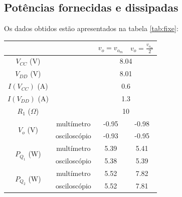 \documentclass[%
  reprint,
  nofootinbib,
  amsmath,amssymb,
  aps,
  10pt,
  a4paper
]{revtex4-1}
\begin{document}
{\subsection{Potências fornecidas e dissipadas}
Os dados obtidos estão apresentados na tabela \ref{tab:fixe}:
\begin{table}[h]
\begin{tabular}{|cc|c|c|}
                                                             & \multicolumn{1}{l|}{} & $v_o=v_{o_m}$ & $v_o=\frac{v_{o_m}}{2}$ \\ \hline
$V_{CC}$ (V)                                                 & \multicolumn{1}{l|}{} & \multicolumn{2}{c|}{8.04}               \\ \hline
$V_{DD}$ (V)                                                 & \multicolumn{1}{l|}{} & \multicolumn{2}{c|}{8.01}               \\ \hline
$I(V_{CC})$ (A)                                              & \multicolumn{1}{l|}{} & \multicolumn{2}{c|}{0.6}                \\ \hline
$I(V_{DD})$ (A)                                              & \multicolumn{1}{l|}{} & \multicolumn{2}{c|}{1.3}                \\ \hline
$R_1$ ($\Omega$)                                             &                       & \multicolumn{2}{c|}{10}                 \\ \hline
\multicolumn{1}{|c|}{\multirow{2}{*}{$V_o$ (V)}}             & multímetro            & -0.95         & -0.98                   \\ \cline{2-4} 
\multicolumn{1}{|c|}{}                                       & osciloscópio          & -0.93         & -0.95                   \\ \hline
\multicolumn{1}{|c|}{\multirow{2}{*}{$P_{Q_1}$ (W)}}         & multímetro            & 5.39          & 5.41                    \\ \cline{2-4} 
\multicolumn{1}{|c|}{}                                       & osciloscópio          & 5.38          & 5.39                    \\ \hline
\multicolumn{1}{|c|}{\multirow{2}{*}{$P_{Q_2}$ (W)}}         & multímetro            & 5.52          & 7.82                    \\ \cline{2-4} 
\multicolumn{1}{|c|}{}                                       & osciloscópio          & 5.52          & 7.81                    \\ \hline

\end{tabular}
\end{table}}
\end{document}
